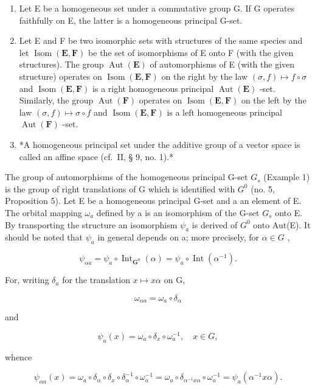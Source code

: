 \begin{enumerate}
\def\labelenumi{(\arabic{enumi})}
\setcounter{enumi}{1}
\item
  Let E be a homogeneous set under a commutative group G. If G operates faithfully on E, the latter is a homogeneous principal G-set.
\item
  Let E and F be two isomorphic sets with structures of the same species and let \(\operatorname{Isom}(\mathbf{E}, \mathbf{F})\) be the set of isomorphisms of E onto F (with the given structures). The group \(\operatorname{Aut}(\mathbf{E})\) of automorphisms of E (with the given structure) operates on \(\operatorname{Isom}(\mathbf{E}, \mathbf{F})\) on the right by the law \((\sigma, f) \mapsto f \circ \sigma\) and \(\operatorname{Isom}(\mathbf{E}, \mathbf{F})\) is a right homogeneous principal \(\operatorname{Aut}(\mathbf{E})\) -set. Similarly, the group \(\operatorname{Aut}(\mathbf{F})\) operates on \(\operatorname{Isom}(\mathbf{E}, \mathbf{F})\) on the left by the law \((\sigma, f) \mapsto \sigma \circ f\) and \(\operatorname{Isom}(\mathbf{E}, \mathbf{F})\) is a left homogeneous principal \(\operatorname{Aut}(\mathbf{F})\) -set.
\item
  *A homogeneous principal set under the additive group of a vector space is called an affine space (cf.~II, § 9, no. 1).*
\end{enumerate}

The group of automorphisms of the homogeneous principal G-set \(G_{s}\) (Example 1) is the group of right translations of G which is identified with \(G^{0}\) (no. 5, Proposition 5). Let E be a homogeneous principal G-set and a an element of E. The orbital mapping \(\omega_{a}\) defined by a is an isomorphism of the G-set \(G_{s}\) onto E. By transporting the structure an isomorphism \(\psi_{a}\) is derived of \(G^{0}\) onto Aut(E). It should be noted that \(\psi_{a}\) in general depends on a; more precisely, for \(\alpha \in G\) ,

\[
\psi_ {\alpha a} = \psi_ {a} \circ \operatorname{Int} _ {\mathbf {G} ^ {0}} (\alpha) = \psi_ {a} \circ \operatorname{Int} (\alpha^ {- 1}).\tag{3}
\]

For, writing \(\delta_{a}\) for the translation \(x\mapsto x\alpha\) on G,

\[
\omega_ {\alpha a} = \omega_ {a} \circ \delta_ {\alpha}
\]

and

\[
\psi_ {a} (x) = \omega_ {a} \circ \delta_ {x} \circ \omega_ {a} ^ {- 1}, \quad x \in G,
\]

whence

\[
\psi_ {\alpha a} (x) = \omega_ {a} \circ \delta_ {\alpha} \circ \delta_ {x} \circ \delta_ {\alpha} ^ {- 1} \circ \omega_ {a} ^ {- 1} = \omega_ {a} \circ \delta_ {\alpha^ {- 1} x \alpha} \circ \omega_ {a} ^ {- 1} = \psi_ {a} (\alpha^ {- 1} x \alpha).
\]


